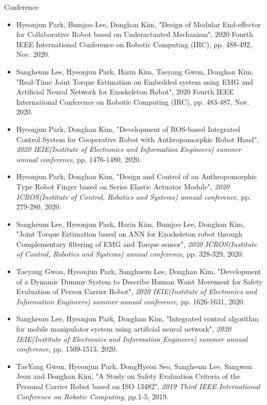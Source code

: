 \documentclass[a4paper,10pt]{article}
\newlength{\cvcolumngapwidth}
\newlength{\cvleftcolumnwidth}
\newlength{\cvrightcolumnwidth}
\newcommand{\cvheadingstyle}[1]{{\normalsize\cvheadingfont\textcolor{cvheadingcolor}{#1}}}
\newlength{\cvafteritemskipamount}
\newlength{\cvparskip}
\newcommand{\cvitem}[2]{
    \begin{minipage}[t]{\cvleftcolumnwidth}
        \raggedleft #1
    \end{minipage}%
    \hspace{\cvcolumngapwidth}%
    \begin{minipage}[t]{\cvrightcolumnwidth}
        \setlength{\parskip}{\cvparskip} #2
    \end{minipage}

    \vspace{\cvafteritemskipamount}
}
\begin{document}
\cvitem{
    \cvheadingstyle{Conference}
}{
    \begin{itemize}
    \item {\cvimportant Hyeonjun Park}, Bumjoo Lee, Donghan Kim, "Design of Modular End-effector for Collaborative Robot based on Underactuated Mechanism", 2020 Fourth IEEE International Conference on Robotic Computing (IRC), pp. 488-492, Nov. 2020.
    \item Sangheum Lee, {\cvimportant Hyeonjun Park}, Harin Kim, Taeyang Gwon, Donghan Kim, "Real-Time Joint Torque Estimation on Embedded system using EMG and Artificial Neural Network for Exoskeleton Robot", 2020 Fourth IEEE International Conference on Robotic Computing (IRC), pp. 483-487, Nov. 2020.
    \item {\cvimportant Hyeonjun Park}, Donghan Kim, "Development of ROS-based Integrated Control System for Cooperative Robot with Anthropomorphic Robot Hand", {\em 2020 IEIE(Institute of Electronics and Information Engineers) summer annual conference}, pp. 1476-1480, 2020.
    \item {\cvimportant Hyeonjun Park}, Donghan Kim, "Design and Control of an Anthropomorphic Type Robot Finger based on Series Elastic Actuator Module", {\em 2020 ICROS(Institute of Control, Robotics and Systems) annual conference}, pp. 279-280, 2020.
    \item Sangheum Lee, {\cvimportant Hyeonjun Park}, Harin Kim, Bumjoo Lee, Donghan Kim, "Joint Torque Estimation based on ANN for Exoskeleton robot through Complementary filtering of EMG and Torque sensor", {\em 2020 ICROS(Institute of Control, Robotics and Systems) annual conference}, pp. 328-329, 2020.
    \item Taeyang Gwon, {\cvimportant Hyeonjun Park}, Sanghuem Lee, Donghan Kim, "Development of a Dynamic Dummy System to Describe Human Waist Movement for Safety Evaluation of Person Carrier Robot", {\em 2020 IEIE(Institute of Electronics and Information Engineers) summer annual conference}, pp. 1626-1631, 2020.
    \item Sangheum Lee, {\cvimportant Hyeonjun Park}, Donghan Kim, "Integrated control algorithm for mobile manipulator system using artificial neural network", {\em 2020 IEIE(Institute of Electronics and Information Engineers) summer annual conference}, pp. 1509-1513, 2020.
    \item TaeYang Gwon, {\cvimportant Hyeonjun Park}, DongHyeon Seo, Sangheum Lee, Sangwon Jeon and Donghan Kim, "A Study on Safety Evaluation Criteria of the Personal Carrier  Robot based on ISO 13482", {\em 2019 Third IEEE International Conference on Robotic Computing}, pp.1-5, 2019.         

\end{itemize}}
\end{document}
